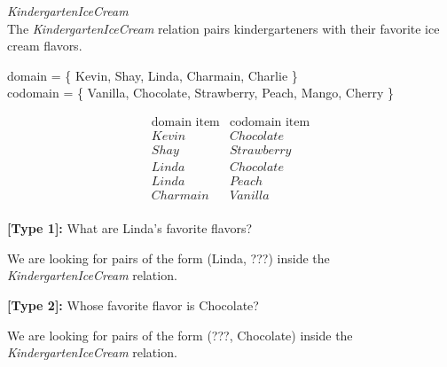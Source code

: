 \documentclass{ximera}
\begin{document}
\begin{example} \textit{KindergartenIceCream} \\
The \textit{KindergartenIceCream} relation pairs kindergarteners with their favorite ice cream flavors.

domain = \{ Kevin, Shay, Linda, Charmain, Charlie \}  \\
codomain = \{ Vanilla, Chocolate, Strawberry, Peach, Mango, Cherry \} 

\[
\begin{array}{l|l}
    \text{domain item}      & \text{codomain item}      \\ \hline
    Kevin   &  Chocolate \\
    Shay   & Strawberry \\
    Linda  &  Chocolate \\
    Linda  &  Peach \\
    Charmain &  Vanilla \\ 
\end{array}
\]


\begin{question}
\textbf{[Type 1]:} What are Linda's favorite flavors? 

\begin{selectAll}
\end{selectAll}
\end{question}

We are looking for pairs of the form (Linda, ???) inside the \textit{KindergartenIceCream} relation.


\begin{question}
\textbf{[Type 2]:} Whose favorite flavor is Chocolate? 

\begin{selectAll}

\end{selectAll}
\end{question}

We are looking for pairs of the form (???, Chocolate) inside the \textit{KindergartenIceCream} relation.



\end{example} 
\end{document}
